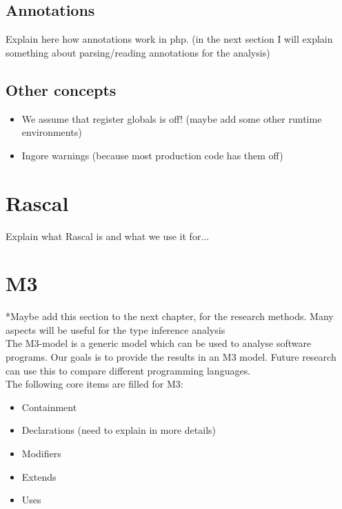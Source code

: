 \documentclass[../main.tex]{subfiles}
\begin{document}
    \subsection{Annotations}
    Explain here how annotations work in php. (in the next section I will explain something about parsing/reading annotations for the analysis)
    
    \subsection{Other concepts}
    \begin{itemize}
        \item We assume that register globals is off! (maybe add some other runtime environments)
        \item Ingore warnings (because most production code has them off)
    \end{itemize}

    
    \section{Rascal}
    Explain what \Gls{Rascal} is and what we use it for...

    \section{M3}
    \footnotesize{*Maybe add this section to the next chapter, for the research methods. Many aspects will be useful for the type inference analysis}
    \\
    The M3-model is a generic model which can be used to analyse software programs.
    Our goals is to provide the results in an M3 model.
    Future research can use this to compare different programming languages.
    \\ 
    The following core items are filled for M3:
    \begin{itemize}
        \item Containment
        \item Declarations (need to explain in more details)
        \item Modifiers
        \item Extends
        \item Uses
    \end{itemize}
    
\end{document}
